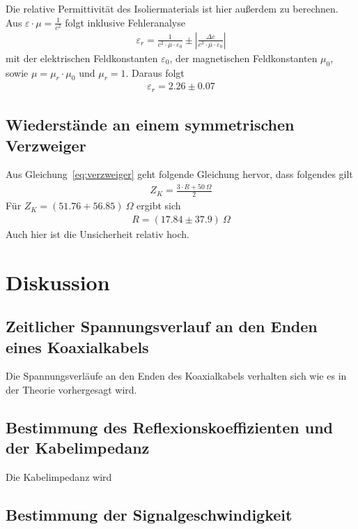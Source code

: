 \documentclass{article}
\begin{document}
Die relative Permittivität des Isoliermaterials ist hier außerdem zu berechnen. Aus $\varepsilon \cdot \mu = \frac{1}{c^2}$ folgt inklusive Fehleranalyse
\begin{align*}
\varepsilon_r = \frac{1}{c^2\cdot \mu\cdot \varepsilon_0} \pm \left| \frac{\Delta c}{c^3\cdot \mu\cdot \varepsilon_0} \right|
\end{align*}
mit der elektrischen Feldkonstanten $\varepsilon_0$, der magnetischen Feldkonstanten $\mu_0$, sowie $\mu = \mu_r\cdot\mu_0$ und $\mu_r=1$. Daraus folgt
\begin{align*}
\varepsilon_r = 2.26 \pm 0.07
\end{align*}


\subsection{Wiederstände an einem symmetrischen Verzweiger}

Aus Gleichung~\eqref{eq:verzweiger} geht folgende Gleichung hervor, dass folgendes gilt
\begin{align*}
Z_K = \frac{3\cdot R + 50~\Omega}{2}
\end{align*}
Für $Z_K = (51.76+56.85)~\Omega$ ergibt sich
\begin{align*}
R = (17.84 \pm 37.9)~\Omega
\end{align*}
Auch hier ist die Unsicherheit relativ hoch.





\section{Diskussion}


\subsection{Zeitlicher Spannungsverlauf an den Enden eines Koaxialkabels}

Die Spannungsverläufe an den Enden des Koaxialkabels verhalten sich wie es in der Theorie vorhergesagt wird. 


\subsection{Bestimmung des Reflexionskoeffizienten und der Kabelimpedanz}

Die Kabelimpedanz wird 



\subsection{Bestimmung der Signalgeschwindigkeit}
\end{document}

